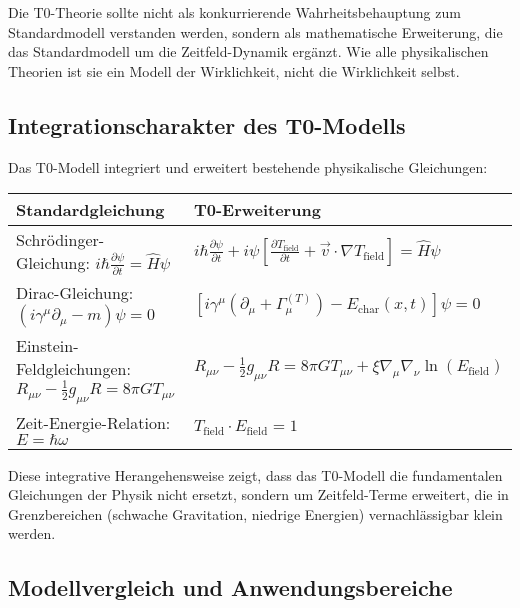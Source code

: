 \documentclass[12pt,a4paper]{article}
\newcommand{\tfield}{T_{\text{field}}}
\theoremstyle{definition}
\begin{document}
\begin{wichtig}
	Die T0-Theorie sollte nicht als konkurrierende Wahrheitsbehauptung zum Standardmodell verstanden werden, sondern als mathematische Erweiterung, die das Standardmodell um die Zeitfeld-Dynamik ergänzt. Wie alle physikalischen Theorien ist sie ein Modell der Wirklichkeit, nicht die Wirklichkeit selbst.
\end{wichtig}

\subsection{Integrationscharakter des T0-Modells}

Das T0-Modell integriert und erweitert bestehende physikalische Gleichungen:

\begin{center}
	\begin{tabular}{|p{6cm}|p{8.5cm}|}
		\hline
		\textbf{Standardgleichung} & \textbf{T0-Erweiterung} \\
		\hline
		Schrödinger-Gleichung: $i \hbar \frac{\partial\psi}{\partial t} = \hat{H}\psi$ & $i \hbar \frac{\partial\psi}{\partial t} + i\psi\left[\frac{\partial \tfield}{\partial t} + \vec{v} \cdot \nabla \tfield\right] = \hat{H}\psi$ \\
		\hline
		Dirac-Gleichung: $(i\gamma^\mu \partial_\mu - m)\psi = 0$ & $\left[i\gamma^\mu\left(\partial_\mu + \Gamma_\mu^{(T)}\right) - E_{\text{char}}(x,t)\right]\psi = 0$ \\
		\hline
		Einstein-Feldgleichungen: $R_{\mu\nu} - \frac{1}{2}g_{\mu\nu}R = 8\pi G T_{\mu\nu}$ & $R_{\mu\nu} - \frac{1}{2}g_{\mu\nu}R = 8\pi G T_{\mu\nu} + \xi\nabla_\mu\nabla_\nu\ln(E_{\text{field}})$ \\
		\hline
		Zeit-Energie-Relation: $E = \hbar\omega$ & $T_{\text{field}} \cdot E_{\text{field}} = 1$ \\
		\hline
	\end{tabular}
\end{center}

Diese integrative Herangehensweise zeigt, dass das T0-Modell die fundamentalen Gleichungen der Physik nicht ersetzt, sondern um Zeitfeld-Terme erweitert, die in Grenzbereichen (schwache Gravitation, niedrige Energien) vernachlässigbar klein werden.

\subsection{Modellvergleich und Anwendungsbereiche}
\end{document}
